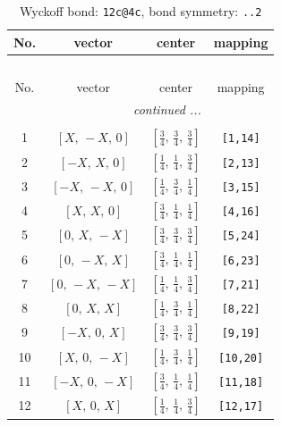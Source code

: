 \documentclass[fleqn,8pt]{jsarticle}
\begin{document}
\renewcommand{\arraystretch}{1.2}
\begin{longtable}{cccc}
\caption{Wyckoff bond: {\tt 12c@4c}, bond symmetry: {\tt ..2}}
 \\
 \hline \hline
No. & vector & center & mapping \\ \hline \endfirsthead

\multicolumn{3}{l}{\tablename\ \thetable{}} \\
 \hline \hline
No. & vector & center & mapping \\ \hline \endhead

 \hline \hline
\multicolumn{3}{r}{\footnotesize\it continued ...} \\ \endfoot

 \hline \hline
\multicolumn{3}{r}{} \\ \endlastfoot

1 & $\left[ X,\, - X,\, 0 \right]$ & $\left[ \frac{3}{4},\, \frac{3}{4},\, \frac{3}{4} \right]$ & {\tt [1,14]} \\ \hline
2 & $\left[ - X,\, X,\, 0 \right]$ & $\left[ \frac{1}{4},\, \frac{1}{4},\, \frac{3}{4} \right]$ & {\tt [2,13]} \\ \hline
3 & $\left[ - X,\, - X,\, 0 \right]$ & $\left[ \frac{1}{4},\, \frac{3}{4},\, \frac{1}{4} \right]$ & {\tt [3,15]} \\ \hline
4 & $\left[ X,\, X,\, 0 \right]$ & $\left[ \frac{3}{4},\, \frac{1}{4},\, \frac{1}{4} \right]$ & {\tt [4,16]} \\ \hline
5 & $\left[ 0,\, X,\, - X \right]$ & $\left[ \frac{3}{4},\, \frac{3}{4},\, \frac{3}{4} \right]$ & {\tt [5,24]} \\ \hline
6 & $\left[ 0,\, - X,\, X \right]$ & $\left[ \frac{3}{4},\, \frac{1}{4},\, \frac{1}{4} \right]$ & {\tt [6,23]} \\ \hline
7 & $\left[ 0,\, - X,\, - X \right]$ & $\left[ \frac{1}{4},\, \frac{1}{4},\, \frac{3}{4} \right]$ & {\tt [7,21]} \\ \hline
8 & $\left[ 0,\, X,\, X \right]$ & $\left[ \frac{1}{4},\, \frac{3}{4},\, \frac{1}{4} \right]$ & {\tt [8,22]} \\ \hline
9 & $\left[ - X,\, 0,\, X \right]$ & $\left[ \frac{3}{4},\, \frac{3}{4},\, \frac{3}{4} \right]$ & {\tt [9,19]} \\ \hline
10 & $\left[ X,\, 0,\, - X \right]$ & $\left[ \frac{1}{4},\, \frac{3}{4},\, \frac{1}{4} \right]$ & {\tt [10,20]} \\ \hline
11 & $\left[ - X,\, 0,\, - X \right]$ & $\left[ \frac{3}{4},\, \frac{1}{4},\, \frac{1}{4} \right]$ & {\tt [11,18]} \\ \hline
12 & $\left[ X,\, 0,\, X \right]$ & $\left[ \frac{1}{4},\, \frac{1}{4},\, \frac{3}{4} \right]$ & {\tt [12,17]} \\
\end{longtable}
\end{document}
